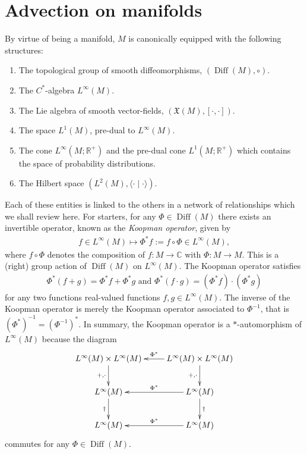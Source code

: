 \documentclass[12pt]{amsart}
\newcommand{\R}{\ensuremath{\mathbb{R}}}
\DeclareMathOperator{\Diff}{Diff}
\begin{document}
\section{Advection on manifolds}
\label{sec:classical}
By virtue of being a manifold, $M$ is canonically equipped with the following structures:
\begin{enumerate}
	\item The topological group of smooth diffeomorphisms, $(\Diff(M), \circ)$.
	\item The $C^*$-algebra $L^\infty(M)$.
	\item The Lie algebra of smooth vector-fields, $(\mathfrak{X}(M) , [ \cdot , \cdot ])$.
	\item The space $L^1(M)$, pre-dual to $L^\infty(M)$.
	\item The cone $L^\infty(M;\R^+)$ and the pre-dual cone $L^1(M;\R^+)$
	which contains the space of probability distributions.
	\item The Hilbert space $(L^2(M), \langle \cdot \mid \cdot \rangle)$.
\end{enumerate}
Each of these entities is linked to the others in a network of relationships
which we shall review here.
For starters, for any $\Phi \in \Diff(M)$ there exists an invertible operator, known as the \emph{Koopman operator}, given by
\begin{align*}
	f \in L^\infty(M) \mapsto \Phi^* f := f \circ \Phi \in L^\infty(M),
\end{align*}
where $f \circ \Phi$ denotes the composition of $f:M \to \mathbb{C}$ with $\Phi:M \to M$.
This is a (right) group action of $\Diff(M)$ on $L^\infty(M)$.
The Koopman operator satisfies
\begin{align*}
	\Phi^*(f+g) = \Phi^*f + \Phi^*g \text{ and } \Phi^*(f\cdot g) = (\Phi^*f) \cdot (\Phi^*g)
\end{align*}
for any two functions real-valued functions $f,g \in L^\infty(M)$.
The inverse of the Koopman operator is merely the Koopman operator associated to $\Phi^{-1}$, that is $(\Phi^*)^{-1} = (\Phi^{-1})^*$.
In summary, the Koopman operator is a $*$-automorphism of $L^\infty(M)$
because the diagram
\begin{equation} \label{cd:classical_ring}
	\xymatrix{
		L^\infty(M) \times L^\infty(M)  \ar[d]_{+,\cdot} & \ar[l]_{ \Phi^*} L^\infty(M) \times L^\infty(M)  \ar[d]_{+,\cdot} \\
		L^\infty(M) \ar[d]_{\dagger} & \ar[l]_{\Phi^*} L^\infty(M) \ar[d]^{\dagger} \\
		L^\infty(M) & \ar[l]_{\Phi^*} L^\infty(M)
	}
\end{equation}
commutes for any $\Phi \in \Diff(M)$.
\end{document}
